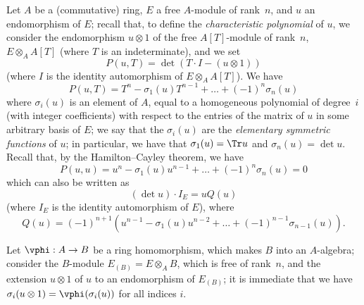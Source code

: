 \begin{env}[6.4.1]
\label{II.6.4.1}
Let $A$ be a (commutative) ring, $E$ a free $A$-module of rank~$n$, and $u$ an endomorphism of $E$;
recall that, to define the \emph{characteristic polynomial} of $u$, we consider the endomorphism $u\otimes1$ of the free $A[T]$-module of rank~$n$, $E\otimes_A A[T]$ (where $T$ is an indeterminate), and we set
\[
\label{II.6.4.1.1}
  P(u,T) = \det(T\cdot I-(u\otimes 1))
\tag{6.4.1.1}
\]
(where $I$ is the identity automorphism of $E\otimes_A A[T]$).
We have
\[
\label{II.6.4.1.2}
  P(u,T) = T^n - \sigma_1(u)T^{n-1} + \ldots + (-1)^n\sigma_n(u)
\tag{6.4.1.2}
\]
where $\sigma_i(u)$ is an element of $A$, equal to a homogeneous polynomial of degree~$i$ (with integer coefficients) with respect to the entries of the matrix of $u$ in some arbitrary basis of $E$;
we say that the $\sigma_i(u)$ are the \emph{elementary symmetric functions} of $u$;
in particular, we have that $\sigma_1(u)=\Tr u$ and $\sigma_n(u)=\det u$.
Recall that, by the Hamilton--Cayley theorem, we have
\[
\label{II.6.4.1.3}
  P(u,u) = u^n - \sigma_1(u)u^{n-1} + \ldots + (-1)^n\sigma_n(u) = 0
\tag{6.4.1.3}
\]
which can also be written as
\[
\label{II.6.4.1.4}
  (\det u)\cdot I_E = uQ(u)
\tag{6.4.1.4}
\]
(where $I_E$ is the identity automorphism of $E$), where
\[
\label{II.6.4.1.5}
  Q(u) = (-1)^{n+1}(u^{n-1}-\sigma_1(u)u^{n-2}+\ldots+(-1)^{n-1}\sigma_{n-1}(u)).
\tag{6.4.1.5}
\]

Let $\vphi:A\to B$ be a ring homomorphism, which makes $B$ into an $A$-algebra;
consider the $B$-module $E_{(B)}=E\otimes_A B$, which is free of rank~$n$, and the extension $u\otimes1$ of $u$ to an endomorphism of $E_{(B)}$;
it is immediate that we have $\sigma_i(u\otimes1)=\vphi(\sigma_i(u))$ for all indices $i$.
\end{env}

